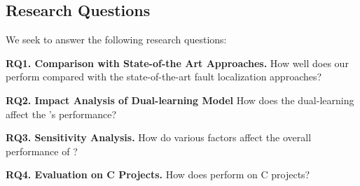 \subsection{Research Questions}

We seek to answer the following research questions:

\noindent\textbf{RQ1. Comparison with State-of-the Art Approaches.} 
How well does our {\tool} perform compared with the state-of-the-art fault localization approaches?

\noindent\textbf{RQ2. Impact Analysis of Dual-learning Model} 
How does the dual-learning affect the {\tool}'s performance?

\noindent\textbf{RQ3. Sensitivity Analysis.} How do various factors affect the overall performance of \tool?


\noindent\textbf{RQ4. Evaluation on C Projects.} How does {\tool} perform on C projects?